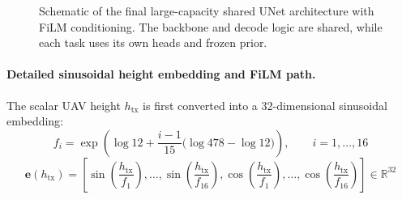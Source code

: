 \begin{figure}[H]
{
}
\caption{Schematic of the final large-capacity shared UNet architecture with FiLM conditioning. The backbone and decode logic are shared, while each task uses its own heads and frozen prior.}
\label{fig:try80_arch}
\end{figure}

\paragraph{Detailed sinusoidal height embedding and FiLM path.}
The scalar UAV height $h_{\mathrm{tx}}$ is first
converted into a 32-dimensional sinusoidal embedding:
\begin{equation}
f_i
=
\exp\!\left(
\log 12
+
\frac{i-1}{15}\bigl(\log 478 - \log 12\bigr)
\right),
\qquad i=1,\dots,16
\end{equation}
\begin{equation}
\textbf{e}(h_{\mathrm{tx}})
=
\left[
\sin\!\left(\frac{h_{\mathrm{tx}}}{f_1}\right), \dots,
\sin\!\left(\frac{h_{\mathrm{tx}}}{f_{16}}\right),
\cos\!\left(\frac{h_{\mathrm{tx}}}{f_1}\right), \dots,
\cos\!\left(\frac{h_{\mathrm{tx}}}{f_{16}}\right)
\right]
\in \mathbb{R}^{32}
\label{eq:try80_height_embed}
\end{equation}

